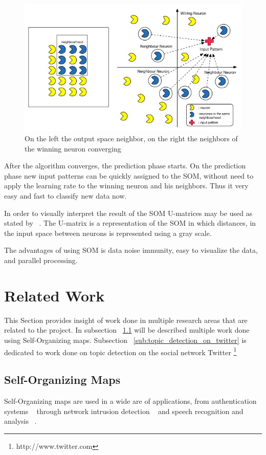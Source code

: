 \begin{figure}
  \begin{center}
    \includegraphics[width=12cm]{images/5_neighbours_converge.jpg}
  \end{center}
  \caption{ On the left the output space neighbor, on the right the neighbors of the winning neuron converging }
  \label{fig:5_neighbours_converge}
\end{figure}

After the algorithm converges, the prediction phase starts. On the prediction phase new input patterns can be quickly assigned to the SOM, without need to apply the learning rate to the winning neuron and his neighbors. Thus it very easy and fast to classify new data now.

In order to visually interpret the result of the SOM U-matrices may be used as stated by ~\citep{Bacao2005}. The U-matrix is a representation of the SOM in which distances, in the input space between neurons is represented using a gray scale.

The advantages of using SOM is data noise immunity, easy to visualize the data, and parallel processing.

\section{Related Work}
\label{sec:related_work}

This Section provides insight of work done in multiple research areas that are related to the project. In subsection ~\ref{sub:self_organizing_maps} will be described multiple work done using Self-Organizing maps. Subsection ~\ref{sub:topic_detection_on_twitter} is dedicated to work done on topic detection on the social network Twitter \footnote{http://www.twitter.com}

\subsection{Self-Organizing Maps} 
\label{sub:self_organizing_maps}
Self-Organizing maps are used in a wide are of applications, from authentication systems ~\cite{Dozono2012} through network intrusion detection ~\cite{intrusion_som} and speech recognition and analysis ~\cite{phonetic_typewiter}.

